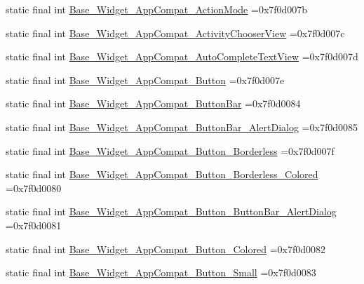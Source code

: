 \begin{DoxyCompactItemize}
static final int \mbox{\hyperlink{classbr_1_1unb_1_1cic_1_1mp_1_1marketmaster_1_1R_1_1style_ac0712e44e8cfdf5b74f2c93659c1e178}{Base\+\_\+\+Widget\+\_\+\+App\+Compat\+\_\+\+Action\+Mode}} =0x7f0d007b
\item 
static final int \mbox{\hyperlink{classbr_1_1unb_1_1cic_1_1mp_1_1marketmaster_1_1R_1_1style_a5ae919f7289e79e58819859caea9ddc3}{Base\+\_\+\+Widget\+\_\+\+App\+Compat\+\_\+\+Activity\+Chooser\+View}} =0x7f0d007c
\item 
static final int \mbox{\hyperlink{classbr_1_1unb_1_1cic_1_1mp_1_1marketmaster_1_1R_1_1style_a3a746b8ce5a6f253e5ab2a5a4ac32f9b}{Base\+\_\+\+Widget\+\_\+\+App\+Compat\+\_\+\+Auto\+Complete\+Text\+View}} =0x7f0d007d
\item 
static final int \mbox{\hyperlink{classbr_1_1unb_1_1cic_1_1mp_1_1marketmaster_1_1R_1_1style_a1a073978ea82045eea1cb6d793afb562}{Base\+\_\+\+Widget\+\_\+\+App\+Compat\+\_\+\+Button}} =0x7f0d007e
\item 
static final int \mbox{\hyperlink{classbr_1_1unb_1_1cic_1_1mp_1_1marketmaster_1_1R_1_1style_abd670c2bc7784455e0026747408e03ca}{Base\+\_\+\+Widget\+\_\+\+App\+Compat\+\_\+\+Button\+Bar}} =0x7f0d0084
\item 
static final int \mbox{\hyperlink{classbr_1_1unb_1_1cic_1_1mp_1_1marketmaster_1_1R_1_1style_aba95b89ebe78a5666d322076787a1b7e}{Base\+\_\+\+Widget\+\_\+\+App\+Compat\+\_\+\+Button\+Bar\+\_\+\+Alert\+Dialog}} =0x7f0d0085
\item 
static final int \mbox{\hyperlink{classbr_1_1unb_1_1cic_1_1mp_1_1marketmaster_1_1R_1_1style_a9240c77f339192edf174727cf0b19679}{Base\+\_\+\+Widget\+\_\+\+App\+Compat\+\_\+\+Button\+\_\+\+Borderless}} =0x7f0d007f
\item 
static final int \mbox{\hyperlink{classbr_1_1unb_1_1cic_1_1mp_1_1marketmaster_1_1R_1_1style_aa9ef4051d4558b9f9274708b486b7675}{Base\+\_\+\+Widget\+\_\+\+App\+Compat\+\_\+\+Button\+\_\+\+Borderless\+\_\+\+Colored}} =0x7f0d0080
\item 
static final int \mbox{\hyperlink{classbr_1_1unb_1_1cic_1_1mp_1_1marketmaster_1_1R_1_1style_a16024a5717dbacecd0b4aba00f92f784}{Base\+\_\+\+Widget\+\_\+\+App\+Compat\+\_\+\+Button\+\_\+\+Button\+Bar\+\_\+\+Alert\+Dialog}} =0x7f0d0081
\item 
static final int \mbox{\hyperlink{classbr_1_1unb_1_1cic_1_1mp_1_1marketmaster_1_1R_1_1style_a79ad99660b8e6b0b2b131c0defddc735}{Base\+\_\+\+Widget\+\_\+\+App\+Compat\+\_\+\+Button\+\_\+\+Colored}} =0x7f0d0082
\item 
static final int \mbox{\hyperlink{classbr_1_1unb_1_1cic_1_1mp_1_1marketmaster_1_1R_1_1style_a5a1fd7059665ed5064bab305aaeab94c}{Base\+\_\+\+Widget\+\_\+\+App\+Compat\+\_\+\+Button\+\_\+\+Small}} =0x7f0d0083

\end{DoxyCompactItemize}
